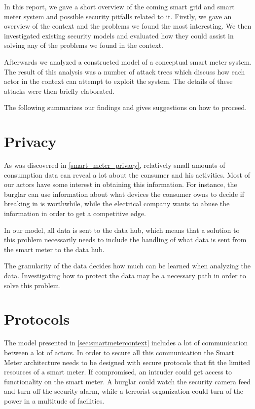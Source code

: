 In this report, we gave a short overview of the coming smart grid and smart meter system and possible security pitfalls related to it.
Firstly, we gave an overview of the context and the problems we found the most interesting.
We then investigated existing security models and evaluated how they could assist in solving any of the problems we found in the context.

Afterwards we analyzed a constructed model of a conceptual smart meter system.
The result of this analysis was a number of attack trees which discuss how each actor in the context can attempt to exploit the system.
The details of these attacks were then briefly elaborated.

The following summarizes our findings and gives suggestions on how to proceed.

\section{Privacy}
As was discovered in \cref{smart_meter_privacy}, relatively small amounts of consumption data can reveal a lot about the consumer and his activities.
Most of our actors have some interest in obtaining this information.
For instance, the burglar can use information about what devices the consumer owns to decide if breaking in is worthwhile, while the electrical company wants to abuse the information in order to get a competitive edge.

In our model, all data is sent to the data hub, which means that a solution to this problem necessarily needs to include the handling of what data is sent from the smart meter to the data hub.

The granularity of the data decides how much can be learned when analyzing the data.
Investigating how to protect the data may be a necessary path in order to solve this problem.

\section{Protocols}
The model presented in \cref{sec:smartmetercontext} includes a lot of communication between a lot of actors.
In order to secure all this communication the Smart Meter architecture needs to be designed with secure protocols that fit the limited resources of a smart meter.
If compromised, an intruder could get access to functionality on the smart meter.
A burglar could watch the security camera feed and turn off the security alarm, while a terrorist organization could turn of the power in a multitude of facilities.

